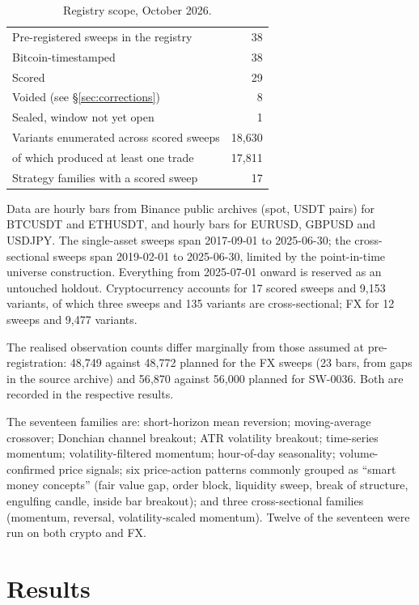 \documentclass[11pt,a4paper]{article}
\begin{document}
\begin{table}[ht]
\centering
\begin{tabular}{lr}
\toprule
Pre-registered sweeps in the registry & 38 \\
Bitcoin-timestamped & 38 \\
Scored & 29 \\
Voided (see \S\ref{sec:corrections}) & 8 \\
Sealed, window not yet open & 1 \\
\midrule
Variants enumerated across scored sweeps & 18{,}630 \\
\quad of which produced at least one trade & 17{,}811 \\
Strategy families with a scored sweep & 17 \\
\bottomrule
\end{tabular}
\caption{Registry scope, October 2026.}
\end{table}

Data are hourly bars from Binance public archives (spot, USDT pairs) for
BTCUSDT and ETHUSDT, and hourly bars for EURUSD, GBPUSD and USDJPY. The
single-asset sweeps span 2017-09-01 to 2025-06-30; the cross-sectional
sweeps span 2019-02-01 to 2025-06-30, limited by the point-in-time universe
construction. Everything from 2025-07-01 onward is reserved as an untouched
holdout. Cryptocurrency accounts for 17 scored sweeps and 9{,}153 variants, of which
three sweeps and 135 variants are cross-sectional; FX for 12 sweeps and
9{,}477 variants.

The realised observation counts differ marginally from those assumed at
pre-registration: 48{,}749 against 48{,}772 planned for the FX sweeps (23
bars, from gaps in the source archive) and 56{,}870 against 56{,}000 planned
for SW-0036. Both are recorded in the respective results.

The seventeen families are: short-horizon mean reversion; moving-average
crossover; Donchian channel breakout; ATR volatility breakout; time-series
momentum; volatility-filtered momentum; hour-of-day seasonality;
volume-confirmed price signals; six price-action patterns commonly grouped
as ``smart money concepts'' (fair value gap, order block, liquidity sweep,
break of structure, engulfing candle, inside bar breakout); and three
cross-sectional families (momentum, reversal, volatility-scaled momentum).
Twelve of the seventeen were run on both crypto and FX.

\section{Results}
\end{document}
